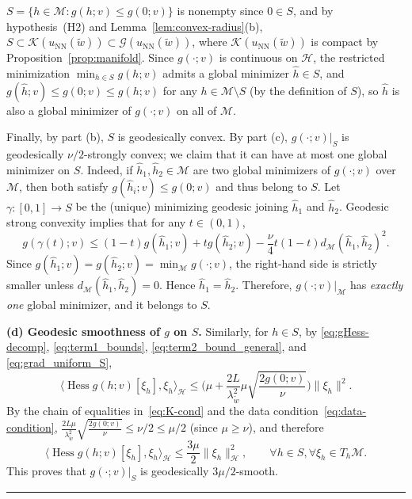 \documentclass[twoside,11pt]{article}
\newcommand{\BlackBoxProof}{\rule{1.5ex}{1.5ex}}
\renewenvironment{proof}{\par\noindent{\bf Proof\ }}{\hfill\BlackBoxProof\par\medskip}
\newcommand{\Hess}{\operatorname{Hess} }
\newcommand{\NN}{\mathrm{NN}}
\newcommand{\calG}{\mathcal{G}}
\newcommand{\calH}{\mathcal{H}}
\newcommand{\calK}{\mathcal{K}}
\newcommand{\calM}{\mathcal{M}}
\begin{document}
\begin{proof}
$S=\{h\in\mathcal M:  g(h;v)\le g(0;v)\}$ is nonempty since $0 \in S$, and by hypothesis~(H2) and Lemma~\ref{lem:convex-radius}(b), $S\subset\calK(u_\NN(\tilde w))\subset\calG(u_\NN(\tilde w))$, where $\calK(u_\NN(\tilde w))$ is compact by Proposition~\ref{prop:manifold}. Since $g(\cdot;v)$ is continuous on $\calH$, the restricted minimization $\min_{h\in S} g(h;v)$ admits a global minimizer $\hat h\in S$, and $g(\hat h;v)\le g(0;v)\le g(h;v)$ for any $h\in\calM\setminus S$ (by the definition of $S$), so $\hat h$ is also a global minimizer of $g(\cdot;v)$ on all of $\calM$.

Finally, by part (b), $S$ is geodesically convex. By part (c), $g(\cdot;v)|_S$ is geodesically
$\nu/2$-strongly convex; we claim that it can have at most one global minimizer on $S$. Indeed,
if $\hat h_1,\hat h_2\in\mathcal M$ are two global minimizers of $g(\cdot;v)$ over $\mathcal M$,
then both satisfy $g(\hat h_i;v)\le g(0;v)$ and thus belong to $S$.
Let $\gamma:[0,1]\to S$ be the (unique) minimizing geodesic joining $\hat h_1$ and $\hat h_2$.
Geodesic strong convexity implies that for any $t\in(0,1)$,
\[
g(\gamma(t);v)
\le (1-t)g(\hat h_1;v)+t g(\hat h_2;v)-\frac{\nu}{4}t(1-t)d_{\mathcal M}(\hat h_1,\hat h_2)^2.
\]
Since $g(\hat h_1;v)=g(\hat h_2;v)=\min_{\mathcal M} g(\cdot;v)$, the right-hand side is strictly
smaller unless $d_{\mathcal M}(\hat h_1,\hat h_2)=0$. Hence $\hat h_1=\hat h_2$.
Therefore, $g(\cdot;v)|_{\mathcal M}$ has \emph{exactly one} global minimizer, and it belongs to $S$.

\medskip
\noindent\textbf{(d) Geodesic smoothness of $g$ on $S$.}
Similarly, for $h\in S$, by \eqref{eq:gHess-decomp}, \eqref{eq:term1_bounds},
\eqref{eq:term2_bound_general}, and \eqref{eq:grad_uniform_S},
\[
\langle \Hess g(h;v)[\xi_h],\xi_h\rangle_{\mathcal H}
\le \Big(\mu+\frac{2L}{\lambda_{\tilde w}^2}\mu\sqrt{\frac{2g(0;v)}{\nu}}\Big)\|\xi_h\|^2.
\]
By the chain of equalities in~\eqref{eq:K-cond} and the data condition~\eqref{eq:data-condition},
$\frac{2L\mu}{\lambda_{\tilde w}^2}\sqrt{\frac{2g(0;v)}{\nu}}\le \nu/2\le \mu/2$ (since $\mu\ge\nu$),
and therefore
\[
\langle \Hess g(h;v)[\xi_h],\xi_h\rangle_{\mathcal H}
\le \frac{3\mu}{2} \|\xi_h\|_{\mathcal H}^2,
\qquad \forall h\in S,  \forall \xi_h\in T_h\mathcal M.
\]
This proves that $g(\cdot;v)|_S$ is geodesically $3\mu/2$-smooth.
\end{proof}
\end{document}
